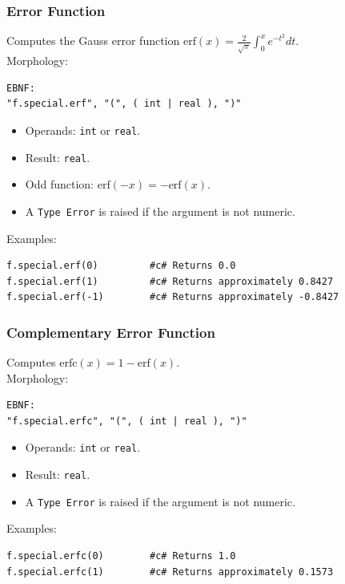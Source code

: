 \subsubsection{Error Function}
Computes the Gauss error function $\text{erf}(x) = \frac{2}{\sqrt{\pi}} \int_0^x e^{-t^2} dt$. \\
Morphology:
\begin{verbatim}
EBNF:
"f.special.erf", "(", ( int | real ), ")"
\end{verbatim}
\begin{itemize}
\item Operands: \texttt{int} or \texttt{real}.
\item Result: \texttt{real}.
\item Odd function: $\text{erf}(-x) = -\text{erf}(x)$.
\item A \texttt{Type Error} is raised if the argument is not numeric.
\end{itemize}
Examples:
\begin{verbatim}
f.special.erf(0)         #c# Returns 0.0
f.special.erf(1)         #c# Returns approximately 0.8427
f.special.erf(-1)        #c# Returns approximately -0.8427
\end{verbatim}

\subsubsection{Complementary Error Function}
Computes $\text{erfc}(x) = 1 - \text{erf}(x)$. \\
Morphology:
\begin{verbatim}
EBNF:
"f.special.erfc", "(", ( int | real ), ")"
\end{verbatim}
\begin{itemize}
\item Operands: \texttt{int} or \texttt{real}.
\item Result: \texttt{real}.
\item A \texttt{Type Error} is raised if the argument is not numeric.
\end{itemize}
Examples:
\begin{verbatim}
f.special.erfc(0)        #c# Returns 1.0
f.special.erfc(1)        #c# Returns approximately 0.1573
\end{verbatim}

